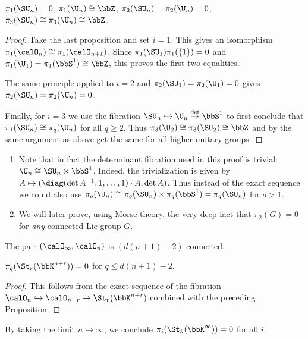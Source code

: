 \begin{cor}
    $\pi_1(\SU_n)=0$, $\pi_1(\U_n)\cong \bbZ$, $\pi_2(\SU_n)=\pi_2(\U_n)=0$, $\pi_3(\SU_n)\cong \pi_3(\U_n)\cong\bbZ$.
\end{cor}
\begin{proof}
    Take the last proposition and set $i=1$. This gives an isomorphism $\pi_1(\calO_n)\cong \pi_1(\calO_{n+1})$. Since $\pi_1(\SU_1)\pi_1(\{1\})=0$ and $\pi_1(\U_1)=\pi_1(\bbS^1)\cong\bbZ$, this proves the first two equalities. 

    The same principle applied to $i=2$ and $\pi_2(\SU_1)=\pi_2(\U_1)=0$ gives $\pi_2(\SU_n)=\pi_2(\U_n)=0$.

    Finally, for $i=3$ we use the fibration $\SU_n\hookrightarrow \U_n\overset{\det}{\to} \bbS^1$ to first conclude that $\pi_1(\SU_n)\cong \pi_q(\U_n)$ for all $q\geq 2$. Thus $\pi_3(\U_2)\cong \pi_3(\SU_2)\cong\bbZ$ and by the same argument as above get the same for all higher unitary groups.
\end{proof}
\begin{rem}
\begin{enumerate}
    \item Note that in fact the determinant fibration used in this proof is trivial: $\U_n\cong \SU_n\times \bbS^1$. Indeed, the trivialization is given by $A\mapsto (\diag(\det A^{-1},1,\ldots,1)\cdot A,\det A)$. Thus instead of the exact sequence we could also use $\pi_q(\U_n)\cong\pi_q(\SU_n)\times \pi_q(\bbS^1)=\pi_q(\SU_n)$ for $q>1$.
    \item We will later prove, using Morse theory, the very deep fact that $\pi_2(G)=0$ for \emph{any} connected Lie group $G$.
\end{enumerate}
\end{rem}



\begin{cor}
    The pair $(\calO_\infty,\calO_n)$ is $(d(n+1)-2)$-connected.
\end{cor}

\begin{cor}
    $\pi_q(\St_r(\bbK^{n+r}))=0$ for $q\leq d(n+1)-2$.
\end{cor}
\begin{proof}
    This follows from the exact sequence of the fibration $\calO_n\hookrightarrow \calO_{n+r}\to \St_{r}(\bbK^{n+r})$ combined with the preceding Proposition.
\end{proof}
\begin{cor}
    By taking the limit $n\to\infty$, we conclude $\pi_i(\St_k(\bbK^\infty))=0$ for all $i$.
\end{cor}

